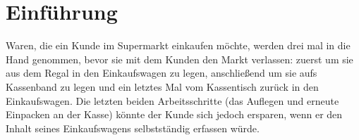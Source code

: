 \seKurzfassung[]




%
%
%
%
\seInhaltsverzeichnis[%
einrueckung=ja,
gliederungsebenen=4
]




%
%
%
%






%
\chapter{Einführung}
Waren, die ein Kunde im Supermarkt einkaufen möchte, werden drei mal in die Hand genommen, bevor sie mit dem Kunden den Markt verlassen: zuerst um sie aus dem Regal in den Einkaufswagen zu legen, anschließend um sie aufs Kassenband zu legen und ein letztes Mal vom Kassentisch zurück in den Einkaufswagen. Die letzten beiden Arbeitsschritte (das Auflegen und erneute Einpacken an der Kasse) könnte der Kunde sich jedoch ersparen, wenn er den Inhalt seines Einkaufswagens selbstständig erfassen würde.

